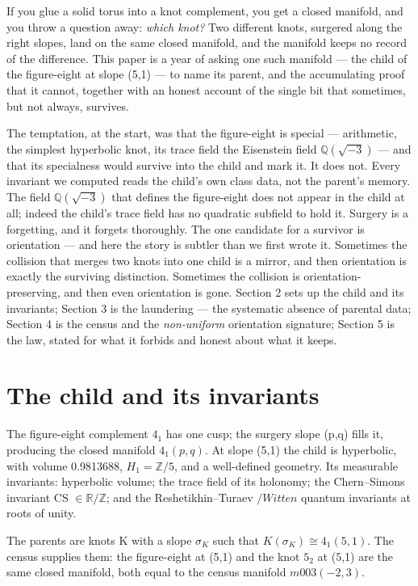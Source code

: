 \documentclass[11pt]{article}
\theoremstyle{plain}
\theoremstyle{definition}
\theoremstyle{remark}
\begin{document}
If you glue a solid torus into a knot complement, you get a closed manifold, and you throw a question away: \emph{which knot?} Two different knots, surgered along the right slopes, land on the same closed manifold, and the manifold keeps no record of the difference. This paper is a year of asking one such manifold — the child of the figure-eight at slope (5,1) — to name its parent, and the accumulating proof that it cannot, together with an honest account of the single bit that sometimes, but not always, survives.

The temptation, at the start, was that the figure-eight is special — arithmetic, the simplest hyperbolic knot, its trace field the Eisenstein field \(\mathbb{Q}(\sqrt{-3})\) — and that its specialness would survive into the child and mark it. It does not. Every invariant we computed reads the child's own class data, not the parent's memory. The field \(\mathbb{Q}(\sqrt{-3})\) that defines the figure-eight does not appear in the child at all; indeed the child's trace field has no quadratic subfield to hold it. Surgery is a forgetting, and it forgets thoroughly. The one candidate for a survivor is orientation — and here the story is subtler than we first wrote it. Sometimes the collision that merges two knots into one child is a mirror, and then orientation is exactly the surviving distinction. Sometimes the collision is orientation-preserving, and then even orientation is gone. Section 2 sets up the child and its invariants; Section 3 is the laundering — the systematic absence of parental data; Section 4 is the census and the \emph{non-uniform} orientation signature; Section 5 is the law, stated for what it forbids and honest about what it keeps.

\section{The child and its invariants}

The figure-eight complement \(4_{1}\) has one cusp; the surgery slope (p,q) fills it, producing the closed manifold \(4_{1}(p,q)\). At slope (5,1) the child is hyperbolic, with volume 0.9813688, \(H_{1} = \mathbb{Z}/5\), and a well-defined geometry. Its measurable invariants: hyperbolic volume; the trace field of its holonomy; the Chern–Simons invariant CS \(\in  \mathbb{R}/\mathbb{Z}\); and the Reshetikhin–Turaev \(/ Witten\) quantum invariants at roots of unity.

The parents are knots K with a slope \(\sigma _{K}\) such that \(K(\sigma _{K}) \cong  4_{1}(5,1)\). The census supplies them: the figure-eight at (5,1) and the knot \(5_{2}\) at (5,1) are the same closed manifold, both equal to the census manifold \(m003(-2,3)\).
\end{document}
